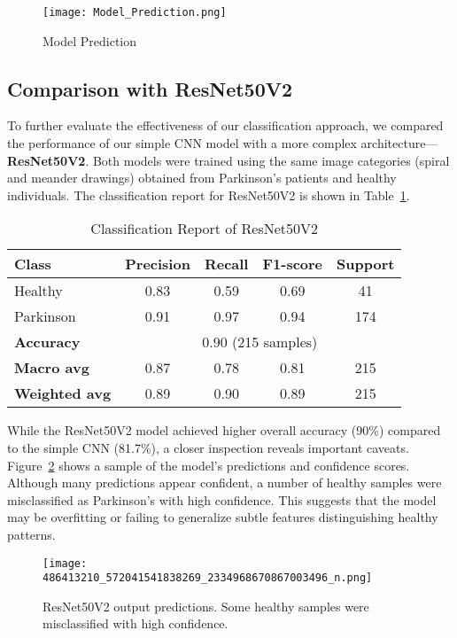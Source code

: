 \documentclass[twocolumn]{article}
\begin{document}
\begin{figure}
    \centering
    \texttt{[image: Model\_Prediction.png]}
    \caption{Model Prediction}
    \label{fig:enter-label}
\end{figure}

\subsection*{Comparison with ResNet50V2}

To further evaluate the effectiveness of our classification approach, we compared the performance of our simple CNN model with a more complex architecture—\textbf{ResNet50V2}. Both models were trained using the same image categories (spiral and meander drawings) obtained from Parkinson’s patients and healthy individuals. The classification report for ResNet50V2 is shown in Table~\ref{tab:resnet50v2_report}.

\begin{table}[H]
\centering
\caption{Classification Report of ResNet50V2}
\label{tab:resnet50v2_report}
\begin{tabular}{lcccc}
\toprule
\textbf{Class} & \textbf{Precision} & \textbf{Recall} & \textbf{F1-score} & \textbf{Support} \\
\midrule
Healthy & 0.83 & 0.59 & 0.69 & 41 \\
Parkinson & 0.91 & 0.97 & 0.94 & 174 \\
\midrule
\textbf{Accuracy} & \multicolumn{4}{c}{0.90 (215 samples)} \\
\textbf{Macro avg} & 0.87 & 0.78 & 0.81 & 215 \\
\textbf{Weighted avg} & 0.89 & 0.90 & 0.89 & 215 \\
\bottomrule
\end{tabular}
\end{table}

While the ResNet50V2 model achieved higher overall accuracy (90\%) compared to the simple CNN (81.7\%), a closer inspection reveals important caveats. Figure~\ref{fig:resnet50v2_output} shows a sample of the model’s predictions and confidence scores. Although many predictions appear confident, a number of healthy samples were misclassified as Parkinson’s with high confidence. This suggests that the model may be overfitting or failing to generalize subtle features distinguishing healthy patterns.

\begin{figure}[H]
\centering
\texttt{[image: 486413210\_572041541838269\_2334968670867003496\_n.png]}
\caption{ResNet50V2 output predictions. Some healthy samples were misclassified with high confidence.}
\label{fig:resnet50v2_output}
\end{figure}
\end{document}
